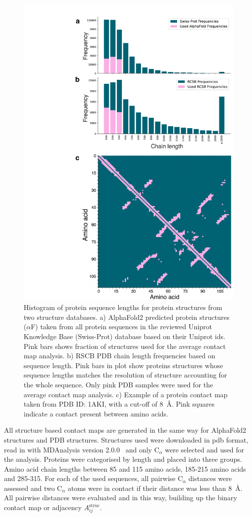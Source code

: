 \documentclass[
reprint,
twocolumn,
amsmath,amssymb,superscriptaddress,aps,
pre]{revtex4-1}
\begin{document}
 \begin{figure}[t]
        \centering
	\includegraphics[width=0.8\columnwidth]{paper/figures/Fig2/Fig2.pdf}
	    \caption{Histogram of protein sequence lengths for protein structures from two structure databases. a) AlphaFold2 predicted protein structures ($\alpha$F) taken from all protein sequences in the reviewed Uniprot Knowledge Base (Swiss-Prot) database based on their Uniprot ids. Pink bars shows fraction of structures used for the average contact map analysis.  b) RSCB PDB chain length frequencies based on sequence length. Pink bars in plot show proteins structures whose sequence lengths matches the resolution of structure accounting for the whole sequence. Only pink PDB samples were used for the average contact map analysis. c) Example of a protein contact map taken from PDB ID: 1AKI, with a cut-off of 8~Å. Pink squares indicate a contact present between amino acids.}
        \label{fig:pdb_stats}
\end{figure}
All structure based contact maps are generated in the same way for AlphaFold2 structures and PDB structures. Structures used were downloaded in pdb format, read in with MDAnalysis version 2.0.0~\cite{gowers2016mdanalysis} and only C$_{\alpha}$ were selected and used for the analysis. Proteins were categorised by length and placed into three groups. Amino acid chain lengths between 85 and 115 amino acids, 185-215 amino acids and 285-315. For each of the used sequences, all pairwise C$_{\alpha}$ distances were assessed and two C$_{\alpha}$ atoms were in contact if their distance was less than 8~Å. All pairwise distances were evaluated and in this way, building up the binary contact map or adjacency $A_{ij}^{\mathrm{struc}}$.  
\end{document}
